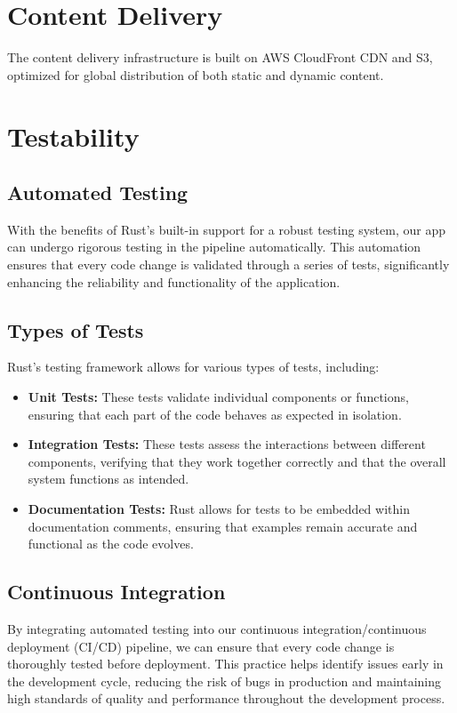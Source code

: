 \documentclass[a4paper, 11pt]{scrreprt}
\begin{document}
\section{Content Delivery}
The content delivery infrastructure is built on AWS CloudFront CDN and S3, optimized for global distribution of both static and dynamic content.

\section{Testability}

\subsection{Automated Testing}
With the benefits of Rust's built-in support for a robust testing system, our app can undergo rigorous testing in the pipeline automatically. This automation ensures that every code change is validated through a series of tests, significantly enhancing the reliability and functionality of the application.

\subsection{Types of Tests}
Rust's testing framework allows for various types of tests, including:
\begin{itemize}
    \item \textbf{Unit Tests:} These tests validate individual components or functions, ensuring that each part of the code behaves as expected in isolation.
    \item \textbf{Integration Tests:} These tests assess the interactions between different components, verifying that they work together correctly and that the overall system functions as intended.
    \item \textbf{Documentation Tests:} Rust allows for tests to be embedded within documentation comments, ensuring that examples remain accurate and functional as the code evolves.
\end{itemize}

\subsection{Continuous Integration}
By integrating automated testing into our continuous integration/continuous deployment (CI/CD) pipeline, we can ensure that every code change is thoroughly tested before deployment. This practice helps identify issues early in the development cycle, reducing the risk of bugs in production and maintaining high standards of quality and performance throughout the development process.
\end{document}
